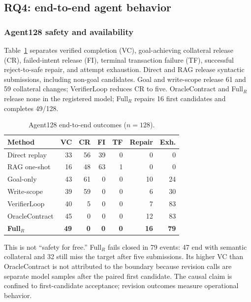 \subsection{RQ4: end-to-end agent behavior}

\subsubsection{Agent128 safety and availability}

Table~\ref{tab:agent128} separates verified completion (VC),
goal-achieving collateral release (CR), failed-intent release (FI), terminal
transaction failure (TF), successful reject-to-safe repair, and attempt
exhaustion.  Direct and RAG release syntactic submissions, including non-goal
candidates.  Goal and write-scope release 61 and 59 collateral changes;
VerifierLoop reduces CR to five.  OracleContract and Full$_R$ release none in
the registered model; Full$_R$ repairs 16 first candidates and completes 49/128.

\begin{table}[t]
\caption{Agent128 end-to-end outcomes ($n=128$).}
\label{tab:agent128}
\centering
\scriptsize
\setlength{\tabcolsep}{2.5pt}
\begin{tabular}{lrrrrrr}
\toprule
Method & VC & CR & FI & TF & Repair & Exh. \\
\midrule
Direct replay & 33 & 56 & 39 & 0 & 0 & 0 \\
RAG one-shot & 16 & 48 & 63 & 1 & 0 & 0 \\
Goal-only & 43 & 61 & 0 & 0 & 10 & 24 \\
Write-scope & 39 & 59 & 0 & 0 & 6 & 30 \\
VerifierLoop & 40 & 5 & 0 & 0 & 7 & 83 \\
OracleContract & 45 & 0 & 0 & 0 & 12 & 83 \\
\textbf{Full$_R$} & \textbf{49} & \textbf{0} & \textbf{0} & \textbf{0} & \textbf{16} & \textbf{79} \\
\bottomrule
\end{tabular}
\end{table}

This is not ``safety for free.''  Full$_R$ fails closed in 79 events: 47 end
with semantic collateral and 32 still miss the target after five submissions.
Its higher VC than OracleContract is not attributed to the boundary because
revision calls are separate model samples after the paired first candidate.
The causal claim is confined to first-candidate acceptance; revision outcomes
measure operational behavior.

